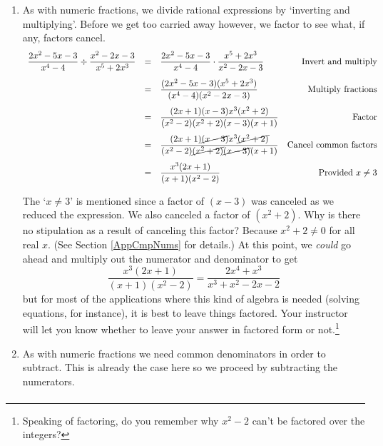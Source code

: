 \documentclass{ximera}
\begin{document}
\begin{example}
\begin{enumerate}

\item As with numeric fractions, we divide rational expressions by `inverting and multiplying'.  Before we get too carried away however, we factor to see what, if any, factors cancel.\[ \begin{array}{rclr}

\dfrac{2x^2-5x-3}{x^4 - 4} \div \dfrac{x^2-2x-3}{x^5 + 2x^3} & = & \dfrac{2x^2-5x-3}{x^4 - 4} \cdot \dfrac{x^5 + 2x^3}{x^2-2x-3} & \text{Invert and multiply} \\ [13pt]

& = & \dfrac{(2x^2-5x-3)(x^5 + 2x^3)}{(x^4 - 4)(x^2-2x-3)} & \text{Multiply fractions}  \\ [13pt]

& = & \dfrac{(2x+1)(x-3)x^3(x^2+2)}{(x^2-2)(x^2+2)(x-3)(x+1)} & \text{Factor} \\ [13pt]

& = & \dfrac{(2x+1)\cancel{(x-3)}x^3\cancel{(x^2+2)}}{(x^2-2)\cancel{(x^2+2)}\cancel{(x-3)}(x+1)} & \text{Cancel common factors} \\ [13pt]

& = & \dfrac{x^3(2x+1)}{(x+1)(x^2-2)} & \text{Provided $x \neq 3$} \\

\end{array}\]

The `$x \neq 3$' is mentioned since a factor of $(x-3)$ was canceled as we reduced the expression.  We also canceled a factor of $(x^2+2)$.  Why is there no stipulation as a result of canceling this factor? Because $x^2 + 2 \neq 0$ for all real $x$. (See Section \ref{AppCmpNums} for details.)  At this point, we \textit{could} go ahead and multiply out the numerator and denominator to get \[\dfrac{x^3(2x+1)}{(x+1)(x^2-2)}  = \dfrac{2x^4 + x^3}{x^3+x^2-2x-2}\] but for most of the applications where this kind of algebra is needed (solving equations, for instance), it is best to leave things factored.  Your instructor will let you know whether to leave your answer in factored form or not.\footnote{Speaking of factoring, do you remember why $x^2-2$ can't be factored over the integers?}

\item  As with numeric fractions we need common denominators in order to subtract.  This is already the case here so we proceed by subtracting the numerators. \[ \begin{array}{rclr}


\end{array}\]
\end{enumerate}
\end{example}
\end{document}
